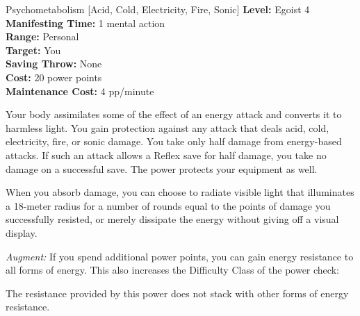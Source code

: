 {Psychometabolism [Acid, Cold, Electricity, Fire, Sonic]}
{
	\textbf{Level:}
	Egoist 4\\
	\textbf{Manifesting Time:}
	1 mental action\\
	\textbf{Range:}
	Personal\\
	\textbf{Target:}
	You\\
	\textbf{Saving Throw:}
	None\\
	\textbf{Cost:}
	20 power points\\
	\textbf{Maintenance Cost:}
	4 pp/minute\\
}
{
	Your body assimilates some of the effect of an energy attack and converts it to harmless light. You gain protection against any attack that deals acid, cold, electricity, fire, or sonic damage. You take only half damage from energy-based attacks. If such an attack allows a Reflex save for half damage, you take no damage on a successful save. The power protects your equipment as well.

	When you absorb damage, you can choose to radiate visible light that illuminates a 18-meter radius for a number of rounds equal to the points of damage you successfully resisted, or merely dissipate the energy without giving off a visual display.

	\textit{Augment:} If you spend additional power points, you can gain energy resistance to all forms of energy. This also increases the Difficulty Class of the power check:


	The resistance provided by this power does not stack with other forms of energy resistance.
}

